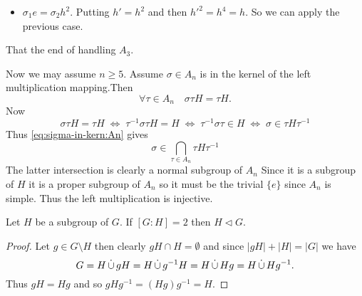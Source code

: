 \documentclass[12pt]{book}
\def\DOTSB{\relax}
\def\dotcup{\DOTSB\mathop{\overset{\textstyle.}\cup}}
\def\subnormal{\vartriangleleft}
\newcounter{myenumi}
\newenvironment{myenumerate}
{\begin{enumerate}
 \setcounter{enumi}{\themyenumi}
}
{\setcounter{myenumi}{\theenumi}
 \end{enumerate}}
\begin{document}
\begin{myenumerate}
\begin{enumerate}[(a)]
\begin{itemize}
\item \(\sigma_1 e = \sigma_2 h^2\).
  Putting \(h' = h^2\) and then \(h'^2 = h^4 = h\).
  So we can apply the previous case.
\end{itemize}
That the end of handling \(A_3\).

Now we may assume \(n \geq 5\).
Assume \(\sigma \in A_n\) is in the kernel
of the left multiplication mapping.Then
\begin{equation} \label{eq:sigma-in-kern:An}
\forall \tau\in A_n\quad \sigma\tau H = \tau H.
\end{equation}
Now
\begin{equation*}
\sigma\tau H = \tau H
\;\Leftrightarrow\;
\tau^{-1}\sigma\tau H = H
\;\Leftrightarrow\;
\tau^{-1}\sigma\tau \in H
\;\Leftrightarrow\;
\sigma \in \tau H \tau^{-1}
\end{equation*}
Thus \eqref{eq:sigma-in-kern:An} gives
\begin{equation*}
\sigma \in \bigcap_{\tau\in A_n} \tau H \tau^{-1}
\end{equation*}
The latter intersection is clearly a normal subgroup of \(A_n\)
Since it is a subgroup of $H$ it is a proper subgroup of \(A_n\)
so it must be the trivial \(\{e\}\) since \(A_n\) is simple.
Thus the left multiplication is injective.


\begin{llem} \label{llem:half:normal}
Let $H$ be a subgroup of $G$. If \([G:H]=2\) then \(H \subnormal G\).
\end{llem}
\begin{proof}
Let \(g \in G\setminus H\) then clearly  \(gH\cap H = \emptyset\)
and since \(|gH| + |H| = |G|\) we have
\begin{equation*}
G = H \dotcup gH = H \dotcup g^{-1}H = H \dotcup Hg = H \dotcup Hg^{-1}.
\end{equation*}
Thus \(gH = Hg\) and so \(gHg^{-1}= (Hg)g^{-1} = H\).
\end{proof}


\end{enumerate}
\end{myenumerate}
\end{document}
